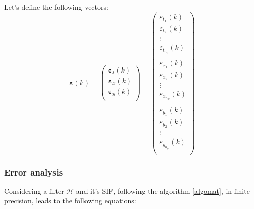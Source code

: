 
	Let's define the following vectors:
	\begin{equation}
		\boldsymbol{\varepsilon}(k) =
		\begin{pmatrix}
			\boldsymbol{\varepsilon}_t(k) \\
			\boldsymbol{\varepsilon}_x(k) \\
			\boldsymbol{\varepsilon}_y(k) \\
		\end{pmatrix}
		=
		\begin{pmatrix}
			{\varepsilon}_{t_1}(k) \\
			{\varepsilon}_{t_2}(k) \\
			\vdots \\
			{\varepsilon}_{t_{n_t}}(k) \\
			\hspace{5pt} \\
			{\varepsilon}_{x_1}(k) \\
			{\varepsilon}_{x_2}(k) \\
			\vdots \\
			{\varepsilon}_{x_{n_x}}(k) \\
			\hspace{5pt} \\
			{\varepsilon}_{y_1}(k) \\
			{\varepsilon}_{y_2}(k) \\
			\vdots \\
			{\varepsilon}_{y_{n_y}}(k) \\
		\end{pmatrix}
	\end{equation}


		
	\subsubsection{Error analysis}

	Considering a filter $\mathcal{H}$ and it’s SIF, following
	the algorithm \ref{algomat}, in finite precision, leads to the following equations:

